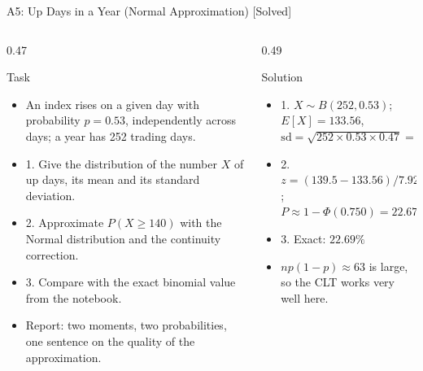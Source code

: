 \begin{frame}{A5: Up Days in a Year (Normal Approximation) [Solved]}
\itemsize{\footnotesize}
\begin{columns}[T]
\begin{column}{0.47\textwidth}
\begin{block}{Task}
\begin{itemize}
    \item An index rises on a given day with probability $p = 0.53$, independently across days; a year has 252 trading days.
    \item 1. Give the distribution of the number $X$ of up days, its mean and its standard deviation.
    \item 2. Approximate $P(X \ge 140)$ with the Normal distribution and the continuity correction.
    \item 3. Compare with the exact binomial value from the notebook.
    \item Report: two moments, two probabilities, one sentence on the quality of the approximation.
\end{itemize}
\end{block}
\end{column}
\begin{column}{0.49\textwidth}
\begin{exampleblock}{Solution}
\begin{itemize}
    \item 1. $X \sim B(252, 0.53)$; $E[X] = 133.56$, $\text{sd} = \sqrt{252 \times 0.53 \times 0.47} = 7.92$
    \item 2. $z = (139.5 - 133.56)/7.92 = 0.750$; $P \approx 1 - \Phi(0.750) = 22.67\%$
    \item 3. Exact: $22.69\%$
    \item $np(1-p) \approx 63$ is large, so the CLT works very well here.
\end{itemize}
\end{exampleblock}
\end{column}
\end{columns}
\end{frame}

